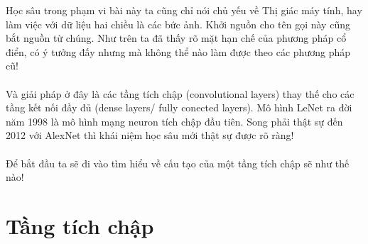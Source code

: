 \documentclass{article}
\begin{document}
Học sâu trong phạm vi bài này ta cũng chỉ nói chủ yếu về Thị giác máy tính, hay làm việc với dữ liệu hai chiều là các bức ảnh. Khởi nguồn cho tên gọi này cũng bắt nguồn từ chúng. Như trên ta đã thấy rõ mặt hạn chế của phương pháp cổ điển, có ý tưởng đấy nhưng mà không thể nào làm được theo các phương pháp cũ!\\\\
Và giải pháp ở đây là các tầng tích chập (convolutional layers) thay thế cho các tầng kết nối đầy đủ (dense layers/ fully conected layers). Mô hình LeNet ra đời năm 1998 là mô hình mạng neuron tích chập đầu tiên. Song phải thật sự đến 2012 với AlexNet thì khái niệm học sâu mới thật sự được rõ ràng!\\\\
Để bắt đầu ta sẽ đi vào tìm hiểu về cấu tạo của một tầng tích chập sẽ như thế nào!
\section{Tầng tích chập}
\end{document}
